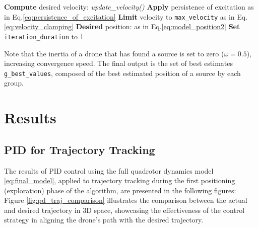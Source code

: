 \begin{algorithm}
{{            
            \textbf{Compute} desired velocity: \textit{update\_velocity()}\;
            \textbf{Apply} persistence of excitation as in Eq.\eqref{eq:persistence_of_excitation}\;
            \textbf{Limit} velocity to \texttt{max\_velocity} as in Eq.\eqref{eq:velocity_clamping}\;
            \textbf{Desired} position: as in Eq.\eqref{eq:model_position2}\;
            \textbf{Set} \texttt{iteration\_duration} to 1\;
        }
    }
\end{algorithm}    
Note that the inertia of a drone that has found a source 
is set to zero (\(\omega = 0.5\)), increasing
convergence speed. The final output is the set of best estimates 
\texttt{g\_best\_values}, composed of the best estimated position 
of a source by each group.

\newpage
\section{Results}
\subsection{PID for Trajectory Tracking}

The results of PID control using the full quadrotor dynamics 
model \eqref{eq:final_model},
applied to trajectory tracking during the first positioning 
(exploration) phase of the algorithm, 
are presented in the following figures: 
Figure \ref{fig:pd_traj_comparison} illustrates 
the comparison between the actual and desired trajectory in 3D space, 
showcasing the effectiveness of the control strategy in 
aligning the drone's path with the desired trajectory.


